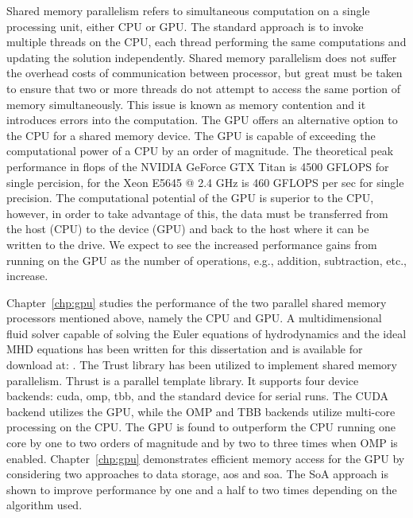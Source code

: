 Shared memory parallelism refers to simultaneous computation on a single processing unit, either CPU or GPU.  The standard approach is to invoke multiple threads on the CPU, each thread performing the same computations and updating the solution independently.  Shared memory parallelism does not suffer the overhead costs of communication between processor, but great must be taken to ensure that two or more threads do not attempt to access the same portion of memory simultaneously.  This issue is known as memory contention and it introduces errors into the computation.  The GPU offers an alternative option to the CPU for a shared memory device.  The GPU is capable of exceeding the computational power of a CPU by an order of magnitude.  The theoretical peak performance in \gls{flops} of the NVIDIA GeForce GTX Titan is 4500 GFLOPS for single percision, for the Xeon E5645 @ 2.4 GHz is 460 GFLOPS per sec for single precision.  The computational potential of the GPU is superior to the CPU, however, in order to take advantage of this, the data must be transferred from the host (CPU) to the device (GPU) and back to the host where it can be written to the drive.  We expect to see the increased performance gains from running on the GPU as the number of operations, e.g., addition, subtraction, etc., increase.  

Chapter~\ref{chp:gpu} studies the performance of the two parallel shared memory processors mentioned above, namely the CPU and GPU.  A multidimensional fluid solver capable of solving the Euler equations of hydrodynamics and the ideal MHD equations has been written for this dissertation and is available for download at: \protect\gitrepo.  The Trust \citep{Thrust} library has been utilized to implement shared memory parallelism.  Thrust is a \cpp parallel template library.  It supports four device backends: \gls{cuda}, \gls{omp}, \gls{tbb}, and the standard \cpp device for serial runs.  The CUDA backend utilizes the GPU, while the OMP and TBB backends utilize multi-core processing on the CPU.  The GPU is found to outperform the CPU running one core by one to two orders of magnitude and by two to three times when OMP is enabled.  Chapter~\ref{chp:gpu} demonstrates efficient memory access for the GPU by considering two approaches to data storage, \gls{aos} and \gls{soa}.  The SoA approach is shown to improve performance by one and a half to two times depending on the algorithm used.  

              




